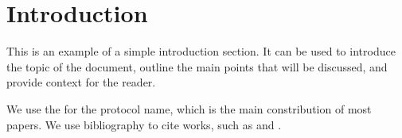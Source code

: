\section{Introduction}

This is an example of a simple introduction section. It can be used to introduce the topic of the document, outline the main points that will be discussed, and provide context for the reader.

We use the \ours for the protocol name, which is the main constribution of most papers.
We use bibliography to cite works, such as \cite{CCS:KKRT16} and \cite{EC:RinSch21}.




